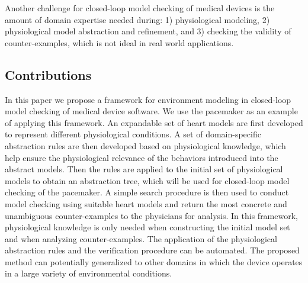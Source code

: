 Another challenge for closed-loop model checking of medical devices is the amount of domain expertise needed during: 1) physiological modeling, 2) physiological model abstraction and refinement, and 3) checking the validity of counter-examples, which is not ideal in real world applications. 




\subsection{Contributions}
In this paper we propose a framework for environment modeling in closed-loop model checking of medical device software.
We use the pacemaker as an example of applying this framework.
An expandable set of heart models are first developed to represent different physiological conditions. 
A set of domain-specific abstraction rules are then developed based on physiological knowledge, which help ensure the physiological relevance of the behaviors introduced into the abstract models. 
Then the rules are applied to the initial set of physiological models to obtain an abstraction tree, which will be used for closed-loop model checking of the pacemaker. 
A simple search procedure is then used to conduct model checking using suitable heart models and return the most concrete and unambiguous counter-examples to the physicians for analysis. 
In this framework, physiological knowledge is only needed when constructing the initial model set and when analyzing counter-examples. 
The application of the physiological abstraction rules and the verification procedure can be automated.
The proposed method can potentially generalized to other domains in which the device operates in a large variety of environmental conditions.
